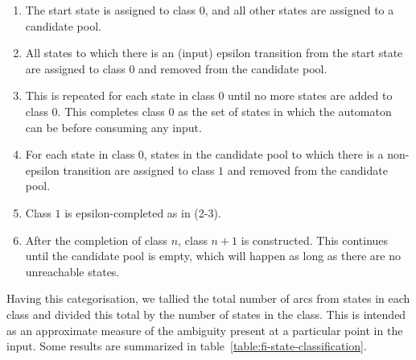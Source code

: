 \documentclass[free]{flammie}
\begin{document}
\begin{enumerate} \itemsep0pt \parskip0pt 
\item The start state is assigned to class $0$,
and all other states are
assigned to a candidate pool.
\item All states to which there is an (input)
epsilon transition from the start state are assigned to class $0$ and
removed from the candidate pool.
\item This is repeated for each state in
class $0$ until no more states
are added to class $0$. This completes class $0$ as the set of states in which
the automaton can be before consuming any input.
\item For each state in class $0$, states in the candidate pool to which there
is a non-epsilon transition are assigned to class $1$ and removed from the
candidate pool.
\item Class $1$ is epsilon-completed as in (2-3).
\item After the completion of class $n$, class $n+1$ is constructed. This
continues until the candidate pool is empty, which will happen
as long as there are no unreachable states.
\end{enumerate}

Having this categorisation, we tallied the total number of arcs from states in
each class and divided this total by the number of states in the class. This
is intended as an approximate measure of the ambiguity present at a particular
point in the input. Some results are summarized in
table~\ref{table:fi-state-classification}.

\end{document}
